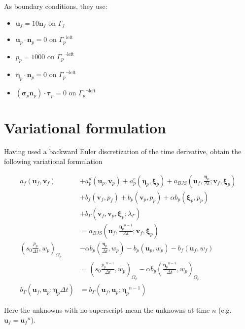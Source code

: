 \documentclass{article}
\newcommand{\sigmabf}{\ensuremath{\boldsymbol{\sigma}}}
\newcommand{\taubf}{\ensuremath{\boldsymbol{\tau}}}
\newcommand{\inner}[2]{\ensuremath{\left (#1, #2 \right)}}
\newcommand{\dt}{\ensuremath{\Delta t}}
\newcommand{\stokesbdy}{\ensuremath{\Gamma_{f}}}
\newcommand{\darcy}{\ensuremath{\Omega_{p}}}
\newcommand{\darcybdy}{\ensuremath{\Gamma_{p}}}
\newcommand{\nf}{\ensuremath{\mathbf{n}_f}}
\newcommand{\np}{\ensuremath{\mathbf{n}_p}}
\newcommand{\uf}{\ensuremath{\mathbf{u}_f}}
\newcommand{\vf}{\ensuremath{\mathbf{v}_f}}
\newcommand{\up}{\ensuremath{\mathbf{u}_p}}
\newcommand{\vp}{\ensuremath{\mathbf{v}_p}}
\newcommand{\pf}{\ensuremath{p_f}}
\newcommand{\pp}{\ensuremath{p_p}}
\newcommand{\wf}{\ensuremath{w_f}}
\renewcommand{\wp}{\ensuremath{w_p}}
\newcommand{\disp}{\ensuremath{\boldsymbol{\eta}_p}}
\newcommand{\disptest}{\ensuremath{\boldsymbol{\xi}_p}}
\newcommand{\mult}{\ensuremath{\lambda_{\Gamma}}}
\begin{document}
As boundary conditions, they use:
\begin{itemize}
\item $\uf = 10 \nf$ on \stokesbdy
\item $\up \cdot \np = 0$ on $\darcybdy^{\text{left}}$
\item $\pp = 1000$ on $\darcybdy^{\neg \text{left}}$
\item $\disp \cdot \np = 0$ on $\darcybdy^{\neg \text{left}}$
\item $(\sigmabf_p \np) \cdot \taubf_p = 0$ on $\darcybdy^{\neg \text{left}}$
  
\end{itemize}
\section{Variational formulation}
Having used a backward Euler discretization of the time derivative, \cite{ambartsumyan} obtain the following variational formulation

\begin{subequations}
  \begin{align}
    a_f (\uf, \vf) &+ a_p^d(\up, \vp) + a_p^e(\disp, \disptest)  + a_{BJS}\left (\uf, \frac {\disp} {\dt}; \vf, \disptest \right) \label{eq:varform1} \\
    & + b_f(\vf, \pf) + b_p(\vp, \pp) + \alpha b_p(\disptest, \pp)   \nonumber \\
    & + b_{\Gamma}(\vf, \vp, \disptest; \mult) \nonumber \\ &= a_{BJS}\left (\uf, \frac {\disp^{n-1}} {\dt}; \vf, \disptest \right)  \nonumber \\ 
    \inner{s_0 \frac {\pp} {\dt}}{\wp}_{\darcy}  &- \alpha b_p\left ( \frac{\disp} {\dt}, \wp \right ) - b_p(\up, \wp) - b_f(\uf, \wf) \label{eq:varform2}
    \\ &= \inner{s_0 \frac {\pp^{n-1}} {\dt}}{\wp}_{\darcy} - \alpha b_p\left ( \frac {\disp^{n-1}} {\dt}, \wp \right )_{\darcy}\nonumber \\
    b_{\Gamma}\left (\uf, \up; \disp \dt \right ) &= b_{\Gamma}\left (\uf, \up; \disp^{n-1} \right ) \label{eq:varform3}
  \end{align}
\end{subequations}

Here the unknowns with no superscript mean the unknowns at time $n$ (e.g. $\uf = \uf^n$).
\end{document}
